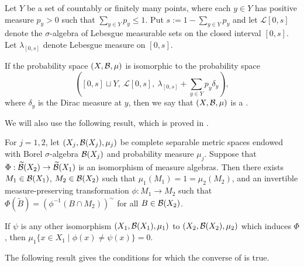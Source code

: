 \begin{definition}
	Let $Y$ be a set of countably or finitely many points, where each $y \in Y$ has positive measure $p_y > 0$ such that $\sum_{y \in Y}{p_y} \leq 1$. Put $s := 1 - \sum_{y \in Y}{p_y}$ and let $\mathcal{L}[0, s]$ denote the $\sigma$-algebra of Lebesgue measurable sets on the closed interval $[0, s]$. Let $\lambda_{[0, s]}$ denote Lebesgue measure on $[0, s]$.
	
	If the probability space $(X, \mathcal{B}, \mu)$ is isomorphic to the probability space
	\[
		\left([0, s] \sqcup Y,\ \mathcal{L}[0, s],\ \lambda_{[0, s]} + \sum_{y \in Y}{p_y \delta_y} \right),
	\]
	where $\delta_y$ is the Dirac measure at $y$, then we say that $(X, \mathcal{B}, \mu)$ is a .
\end{definition}

We will also use the following result, which is proved in \cite[Theorem 12]{royden:real-analysis}.

\begin{lemma} \label{lem:walters-thm-2-2}
	For $j = 1, 2$, let $(X_j, \mathcal{B}(X_j), \mu_j)$ be complete separable metric spaces endowed with Borel $\sigma$-algebra $\mathcal{B}(X_j)$ and probability measure $\mu_j$. Suppose that $\Phi: \widetilde{\mathcal{B}}(X_2) \to \widetilde{\mathcal{B}}(X_1)$ is an isomorphism of measure algebras. Then there exists $M_1 \in \mathcal{B}(X_1)$, $M_2 \in \mathcal{B}(X_2)$ such that $\mu_1(M_1) = 1 = \mu_2(M_2)$, and an invertible measure-preserving transformation $\phi: M_1 \to M_2$ such that $\Phi(\tilde{B}) = (\phi^{-1}(B \cap M_2))^\sim$ for all $B \in \mathcal{B}(X_2)$.
	
	If $\psi$ is any other isomorphism $(X_1, \mathcal{B}(X_1), \mu_1)$ to $(X_2, \mathcal{B}(X_2), \mu_2)$ which induces $\Phi$, then $\mu_1\{x \in X_1 \mid \phi(x) \neq \psi(x)\} = 0$.
\end{lemma}

The following result gives the conditions for which the converse of  is true.

